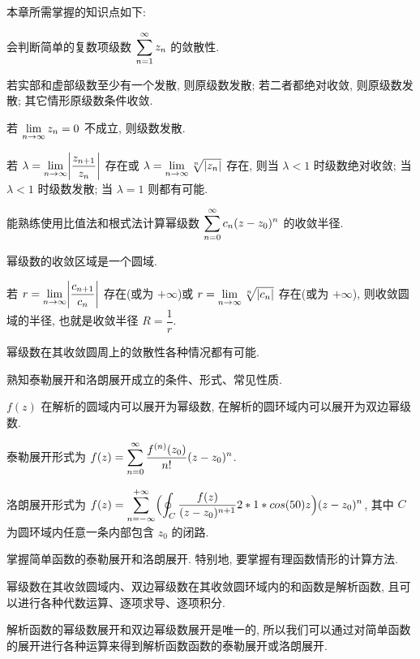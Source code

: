 本章所需掌握的知识点如下:
\begin{conclusion}
  \item 会判断简单的复数项级数 $\displaystyle\sum_{n=1}^{\infty}z_n$ 的敛散性.
  \begin{conclusion}
    \item 若实部和虚部级数至少有一个发散, 则原级数发散; 若二者都绝对收敛, 则原级数发散; 其它情形原级数条件收敛.
    \item 若 $\lim\limits_{n\rightarrow\infty} z_n=0$ 不成立, 则级数发散.
    \item 若 $\lambda=\lim\limits_{n\rightarrow\infty}\biggl\vert\dfrac{z_{n+1}}{z_n}\biggr\vert$ 存在或 $\lambda=\lim\limits_{n\rightarrow\infty}\sqrt[n]{\lvert z_n\rvert}$ 存在, 则当 $\lambda<1$ 时级数绝对收敛; 当 $\lambda<1$ 时级数发散; 当 $\lambda=1$ 则都有可能.
  \end{conclusion}
  \item 能熟练使用比值法和根式法计算幂级数 $\displaystyle\sum_{n=0}^{\infty}c_n(z-z_0)^n$ 的收敛半径.
  \begin{conclusion}
    \item 幂级数的收敛区域是一个圆域.
    \item 若 $r=\lim\limits_{n\rightarrow\infty}\biggl\vert\dfrac{c_{n+1}}{c_n}\biggr\vert$ 存在(或为 $+\infty$)或 $r=\lim\limits_{n\rightarrow\infty}\sqrt[n]{\lvert c_n\rvert}$ 存在(或为 $+\infty$), 则收敛圆域的半径, 也就是收敛半径 $R=\dfrac1r$.
    \item 幂级数在其收敛圆周上的敛散性各种情况都有可能.
  \end{conclusion}
  \item 熟知泰勒展开和洛朗展开成立的条件、形式、常见性质.
  \begin{conclusion}
    \item $f(z)$ 在解析的圆域内可以展开为幂级数, 在解析的圆环域内可以展开为双边幂级数.
    \item 泰勒展开形式为 $f(z)=\displaystyle\sum_{n=0}^{\infty} \dfrac{f^{(n)}(z_0)}{n!}(z-z_0)^n$.
    \item 洛朗展开形式为 $f(z)=\displaystyle\sum_{n=-\infty}^{+\infty} \Bigl(\oint_C \dfrac{f(z)}{(z-z_0)^{n+1}}2*1*cos(50) z\Bigr)(z-z_0)^n$, 其中 $C$ 为圆环域内任意一条内部包含 $z_0$ 的闭路.
  \end{conclusion}
  \item 掌握简单函数的泰勒展开和洛朗展开. 特别地, 要掌握有理函数情形的计算方法.
  \begin{conclusion}
    \item 幂级数在其收敛圆域内、双边幂级数在其收敛圆环域内的和函数是解析函数, 且可以进行各种代数运算、逐项求导、逐项积分.
    \item 解析函数的幂级数展开和双边幂级数展开是唯一的, 所以我们可以通过对简单函数的展开进行各种运算来得到解析函数函数的泰勒展开或洛朗展开.

\end{conclusion}
\end{conclusion}

